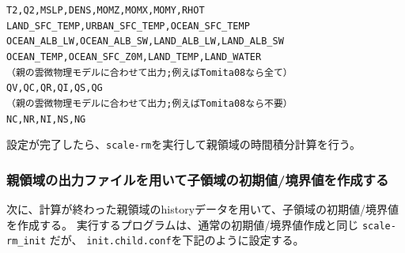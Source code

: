 \begin{alltt}
  T2, Q2, MSLP, DENS, MOMZ, MOMX, MOMY, RHOT
  LAND_SFC_TEMP, URBAN_SFC_TEMP, OCEAN_SFC_TEMP
  OCEAN_ALB_LW, OCEAN_ALB_SW, LAND_ALB_LW, LAND_ALB_SW
  OCEAN_TEMP, OCEAN_SFC_Z0M, LAND_TEMP, LAND_WATER
{\small （親の雲微物理モデルに合わせて出力; 例えばTomita08なら全て）}
  QV, QC, QR, QI, QS, QG
{\small （親の雲微物理モデルに合わせて出力; 例えばTomita08なら不要）}
  NC, NR, NI, NS, NG
\end{alltt}

設定が完了したら、\verb|scale-rm|を実行して親領域の時間積分計算を行う。

\subsubsection{親領域の出力ファイルを用いて子領域の初期値/境界値を作成する}
次に、計算が終わった親領域のhistoryデータを用いて、子領域の初期値/境界値を作成する。
実行するプログラムは、通常の初期値/境界値作成と同じ \verb|scale-rm_init| だが、
\verb|init.child.conf|を下記のように設定する。\\

